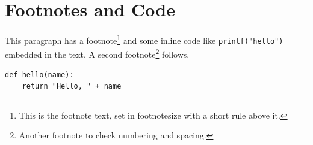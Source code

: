 \documentclass[acmsmall,nonacm]{acmart}
\begin{document}
\section{Footnotes and Code}
This paragraph has a footnote\footnote{This is the footnote text, set in footnotesize with a short rule above it.} and some inline code like \texttt{printf("hello")} embedded in the text. A second footnote\footnote{Another footnote to check numbering and spacing.} follows.

\begin{verbatim}
def hello(name):
    return "Hello, " + name
\end{verbatim}
\end{document}

